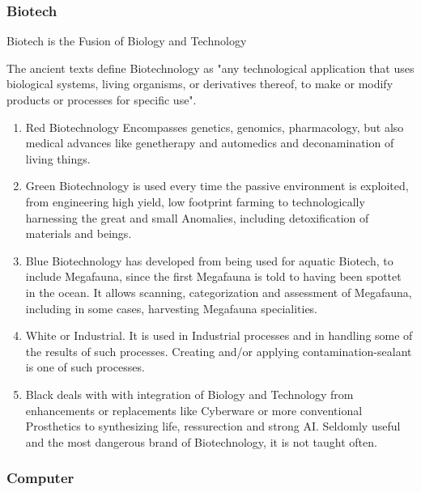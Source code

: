 \subsubsection{Biotech}
Biotech is the Fusion of Biology and Technology \par
The ancient texts define Biotechnology as "any technological application that uses biological systems, living organisms,
or derivatives thereof, to make or modify products or processes for specific use".
\begin{enumerate}[label= -]
    \item {Red} Biotechnology Encompasses genetics, genomics, pharmacology, but also medical advances like
    genetherapy and automedics and deconamination of living things.
    \item {Green} Biotechnology is used every time the passive environment is exploited, from engineering high yield,
    low footprint farming to technologically harnessing the great and small Anomalies,
    including detoxification of materials and beings.
    \item {Blue} Biotechnology has developed from being used for aquatic Biotech, to include Megafauna, since the
    first Megafauna is told to having been spottet in the ocean.
    It allows scanning, categorization and assessment of Megafauna, including in some cases, harvesting Megafauna specialities.
    \item {White} or Industrial.
    It is used in Industrial processes and in handling some of the results of such
    processes.
    Creating and/or applying contamination-sealant is one of such processes.
    \item {Black} deals with with integration of Biology and Technology from enhancements or replacements like
    Cyberware or more conventional Prosthetics to synthesizing life, ressurection and strong AI. Seldomly useful
    and the most dangerous brand of Biotechnology, it is not taught often.
\end{enumerate}
\pagebreak
\subsubsection{Computer}
